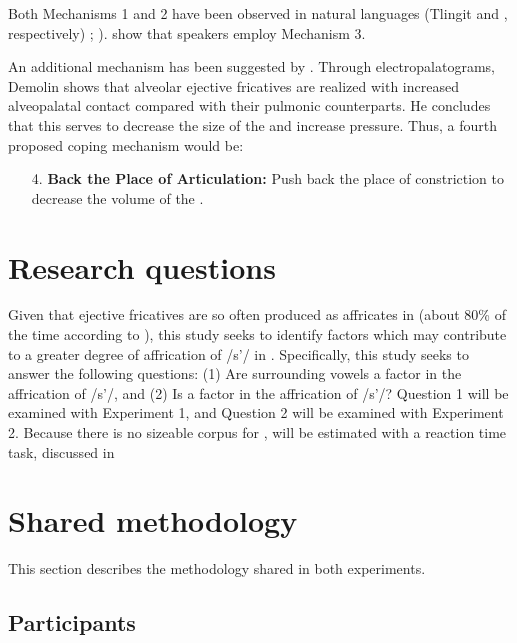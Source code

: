 \documentclass[output=paper
,newtxmath
,modfonts
,nonflat]{langsci/langscibook}
\begin{document}
Both Mechanisms 1 and 2 have been observed in natural languages (Tlingit and , respectively) \citealt{MaddiesonEtAl2001}; \citealt{maddieson1998make}). \citet{shosted2011affricating} show that  speakers employ Mechanism 3.

An additional mechanism has been suggested by \citet{demolin2002search}. Through electropalatograms, Demolin shows that  alveolar ejective fricatives are realized with increased alveopalatal contact compared with their pulmonic counterparts. He concludes that this serves to decrease the size of the  and increase pressure. Thus, a fourth proposed coping mechanism would be:

\begin{enumerate}
	\item[4.] \textbf{Back the Place of Articulation:} Push back the place of constriction to decrease the volume of the  \citep{demolin2002search}.
\end{enumerate}
	
\section{Research questions}\label{sec:moeng:3}

Given that ejective fricatives are so often produced as affricates in  (about 80\% of the time according to \citealt{shosted2011affricating}), this study seeks to identify factors which may contribute to a greater degree of affrication of /s’/ in . Specifically, this study seeks to answer the following questions: (1) Are surrounding vowels a factor in the affrication of /s’/, and (2) Is  a factor in the affrication of /s’/? Question 1 will be examined with Experiment 1, and Question 2 will be examined with Experiment 2. Because there is no sizeable corpus for ,  will be estimated with a reaction time task, discussed in 

\section{Shared methodology}\label{sec:moeng:4}

This section describes the methodology shared in both experiments.

\subsection{Participants}\label{sec:moeng:4.1}
\end{document}
